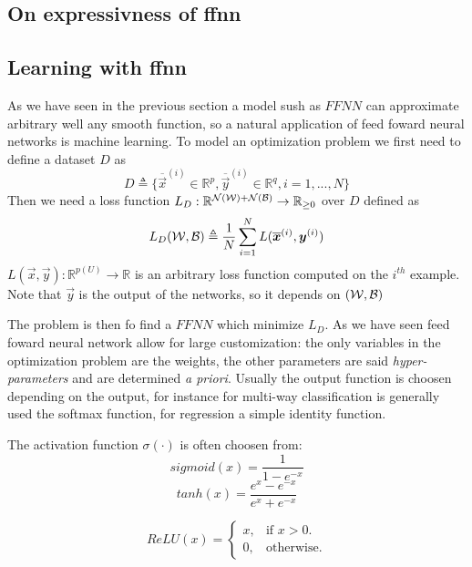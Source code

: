 \subsection{On expressivness of ffnn}
\subsection{Learning with ffnn}

As we have seen in the previous section a model sush as $FFNN$ can approximate arbitrary well any smooth function, so a natural application of feed foward neural networks is machine learning.
To model an optimization problem we first need to define a dataset $D$ as 
\begin{equation}
D\triangleq\{\overline{\vec{x}}^{(i)} \in \mathbb{R}^p, \overline{\vec{y}}^{(i)} \in \mathbb{R}^q,  i=1,...,N\}
\end{equation}
Then we need a loss function $L_D:\mathbb{R}^{\mathcal{N}(\mathcal{W})+\mathcal{N}(\mathcal{B})} \rightarrow \mathbb{R}_{\geq 0}$ over $D$ defined as
\begin{equation}
L_D(\mathcal{W},\mathcal{B})\triangleq\frac{1}{N}\sum_{i=1}^N L(\overline{\boldsymbol{x}}^{(i)},\boldsymbol{y}^{(i)}) 
\end{equation}
$L(\vec{x},\vec{y}):\mathbb{R}^{p(U)} \rightarrow \mathbb{R}$ is an arbitrary loss function computed on the $i^{th}$ example. Note that $\vec{y}$ is the output of the
networks, so it depends on $(\mathcal{W},\mathcal{B})$


The problem is then fo find a $FFNN$ which minimize $L_D$. As we have seen feed foward neural network allow for large customization: the only variables in the optimization problem are the weights, the other
parameters are said \textit{hyper-parameters} and are determined \textit{a priori}. Usually the output function is choosen depending on the output, for instance for multi-way classification
is generally used the softmax function, for regression a simple identity function.

The activation function $\sigma(\cdot)$ is often choosen from:
\begin{equation}
 sigmoid(x)=\frac{1}{1-e^{-x}}
\end{equation}
\begin{equation}
 tanh(x)=\frac{e^x-e^{-x}}{e^x+e^{-x}}
\end{equation}

\begin{equation}
  ReLU(x)=\begin{cases}
    x, & \text{if $x>0$}.\\
    0, & \text{otherwise}.
  \end{cases}
\end{equation}

